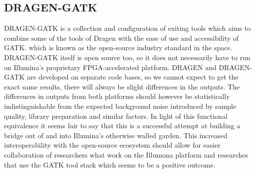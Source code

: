 \documentclass[conference]{IEEEtran}
\begin{document}
\subsection{DRAGEN-GATK}
DRAGEN-GATK is a collection and configuration of exiting tools which aims to combine some of the tools of Dragen with the ease of use and accessibility of GATK. which is known as the open-source industry standard in the space. DRAGEN-GATK itself is open source too, so it does not necessarily have to run on Illumina's proprietary FPGA-accelerated platform. DRAGEN and DRAGEN-GATK are developed on separate code bases, so we cannot expect to get the exact same results, there will always be slight differences in the outputs. The differences in outputs from both platforms should however be statistically indistinguishable from the expected background noise introduced by sample quality, library preparation and similar factors. In light of this functional equivalence it seems fair to say that this is a successful attempt at building a bridge out of and into Illumina's otherwise walled garden. This increased interoperability with the open-source ecosystem should allow for easier collaboration of researchers what work on the Illumona platform and researches that use the GATK tool stack which seems to be a positive outcome\cite{noauthor_dragen_nodate-2}. \\
\end{document}

